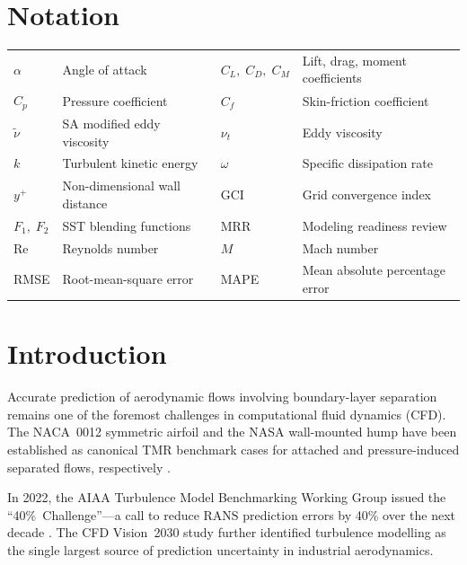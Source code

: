 \documentclass[11pt,a4paper]{article}
\begin{document}
\section*{Notation}
\begin{tabular}{@{}ll@{\qquad}ll@{}}
\toprule
$\alpha$ & Angle of attack & $C_L,\;C_D,\;C_M$ & Lift, drag, moment coefficients \\
$C_p$    & Pressure coefficient & $C_f$ & Skin-friction coefficient \\
$\tilde\nu$ & SA modified eddy viscosity & $\nu_t$ & Eddy viscosity \\
$k$      & Turbulent kinetic energy & $\omega$ & Specific dissipation rate \\
$y^+$    & Non-dimensional wall distance & GCI & Grid convergence index \\
$F_1,\;F_2$ & SST blending functions & MRR & Modeling readiness review \\
Re       & Reynolds number & $M$ & Mach number \\
RMSE     & Root-mean-square error & MAPE & Mean absolute percentage error \\
\bottomrule
\end{tabular}

\section{Introduction}
\label{sec:introduction}

Accurate prediction of aerodynamic flows involving boundary-layer separation
remains one of the foremost challenges in computational fluid dynamics (CFD).
The NACA~0012 symmetric airfoil and the NASA wall-mounted hump have been
established as canonical TMR benchmark cases for attached and pressure-induced
separated flows, respectively \cite{NASA_TMR}.

In 2022, the AIAA Turbulence Model Benchmarking Working Group issued the
``40\%~Challenge''---a call to reduce RANS prediction errors by 40\% over
the next decade \cite{Rumsey2023_40pct}. The CFD Vision~2030 study
\cite{Slotnick2014} further identified turbulence modelling as the single
largest source of prediction uncertainty in industrial aerodynamics.
\end{document}
